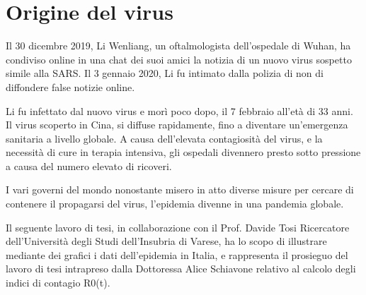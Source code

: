 
\section{Origine del virus}
Il 30 dicembre 2019, Li Wenliang, un oftalmologista dell’ospedale di Wuhan, ha condiviso online in una chat dei suoi amici la notizia di un nuovo virus sospetto simile alla SARS.
Il 3 gennaio 2020, Li fu intimato dalla polizia di non di diffondere false notizie online.

\noindent Li fu infettato dal nuovo virus e morì poco dopo, il 7 febbraio all’età di 33 anni.
Il virus scoperto in Cina, si diffuse rapidamente, fino a diventare un'emergenza sanitaria a livello globale.
A causa dell’elevata contagiosità del virus, e la necessità di cure in terapia intensiva, gli ospedali divennero presto sotto pressione a causa del numero elevato di ricoveri.


\noindent I vari governi del mondo nonostante misero in atto diverse misure per cercare di contenere il propagarsi  del virus,  l'epidemia divenne in una pandemia globale.


\noindent Il seguente lavoro di tesi, in collaborazione con il Prof. Davide Tosi Ricercatore dell’Università degli Studi dell’Insubria di Varese,  ha lo scopo di illustrare mediante dei grafici i dati dell’epidemia in Italia, e rappresenta il prosieguo del lavoro di tesi intrapreso dalla Dottoressa Alice Schiavone relativo al calcolo degli indici di contagio R0(t).